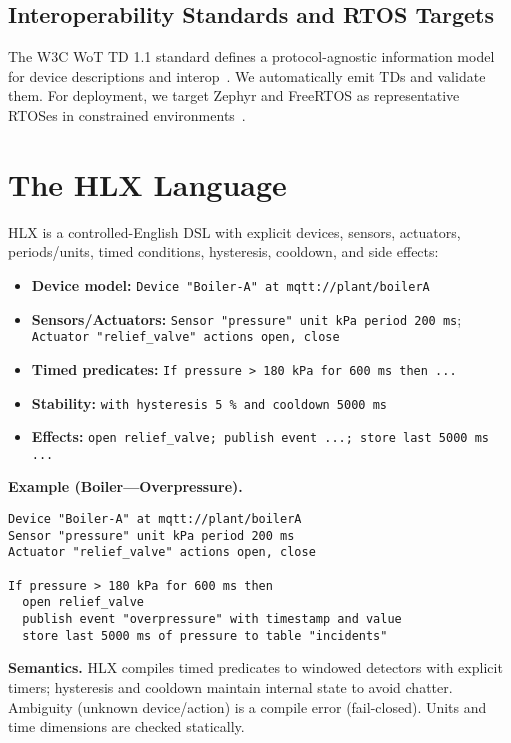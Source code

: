 \documentclass[journal]{IEEEtran}
\begin{document}
\subsection{Interoperability Standards and RTOS Targets}
The W3C WoT TD 1.1 standard defines a protocol-agnostic information model for device descriptions and interop~\cite{WoT11}. We automatically emit TDs and validate them. For deployment, we target Zephyr and FreeRTOS as representative RTOSes in constrained environments~\cite{ZephyrDocs,FreeRTOSDocs}.

\section{The HLX Language}
HLX is a controlled-English DSL with explicit devices, sensors, actuators, periods/units, timed conditions, hysteresis, cooldown, and side effects:
\begin{itemize}
  \item \textbf{Device model:} \texttt{Device "Boiler-A" at mqtt://plant/boilerA}
  \item \textbf{Sensors/Actuators:} \texttt{Sensor "pressure" unit kPa period 200 ms}; \texttt{Actuator "relief\_valve" actions open, close}
  \item \textbf{Timed predicates:} \texttt{If pressure > 180 kPa for 600 ms then ...}
  \item \textbf{Stability:} \texttt{with hysteresis 5 \% and cooldown 5000 ms}
  \item \textbf{Effects:} \texttt{open relief\_valve; publish event ...; store last 5000 ms ...}
\end{itemize}

\noindent\textbf{Example (Boiler—Overpressure).}
\begin{lstlisting}[language={},basicstyle=\ttfamily\small]
Device "Boiler-A" at mqtt://plant/boilerA
Sensor "pressure" unit kPa period 200 ms
Actuator "relief_valve" actions open, close

If pressure > 180 kPa for 600 ms then
  open relief_valve
  publish event "overpressure" with timestamp and value
  store last 5000 ms of pressure to table "incidents"
\end{lstlisting}

\noindent \textbf{Semantics.} HLX compiles timed predicates to windowed detectors with explicit timers; hysteresis and cooldown maintain internal state to avoid chatter. Ambiguity (unknown device/action) is a compile error (fail-closed). Units and time dimensions are checked statically.
\end{document}
